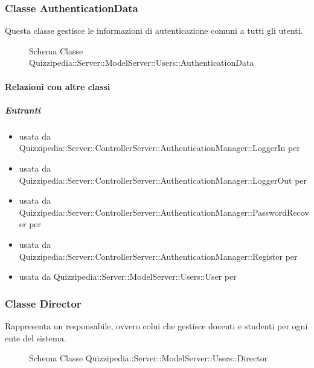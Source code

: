\subsubsection{Classe AuthenticationData}
Questa classe gestisce le informazioni di autenticazione comuni a tutti gli utenti.
\begin{figure}[H]
\centering
\noindent{}
\caption[Schema Classe AuthenticationData]{Schema Classe Quizzipedia::Server::ModelServer::Users::AuthenticationData}
\end{figure}
\paragraph{Relazioni con altre classi}
\subparagraph{Entranti}
\begin{itemize}
\item usata da Quizzipedia::Server::ControllerServer::AuthenticationManager::LoggerIn per 
\item usata da Quizzipedia::Server::ControllerServer::AuthenticationManager::LoggerOut per 
\item usata da Quizzipedia::Server::ControllerServer::AuthenticationManager::PasswordRecover per 
\item usata da Quizzipedia::Server::ControllerServer::AuthenticationManager::Register per 
\item usata da Quizzipedia::Server::ModelServer::Users::User per 
\end{itemize}
\subsubsection{Classe Director}
Rappresenta un responsabile, ovvero colui che gestisce docenti e studenti per ogni ente del sistema.
\begin{figure}[H]
\centering
\noindent{}
\caption[Schema Classe Director]{Schema Classe Quizzipedia::Server::ModelServer::Users::Director}
\end{figure}
